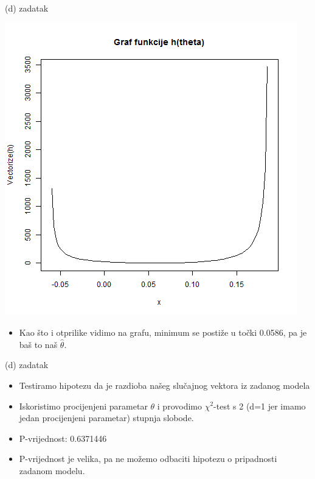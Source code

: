 \documentclass{beamer}
\begin{document}
\begin{frame}{(d) zadatak}
\begin{center}
\includegraphics[scale=0.28]{4.png}\\
\end{center}
\begin{itemize}
\item Kao što i otprilike vidimo na grafu, minimum se postiže u točki 0.0586, pa je baš to naš $\hat{\theta}$. \\
\end{itemize}
\end{frame}

\begin{frame}{(d) zadatak}
\begin{itemize}
\item Testiramo hipotezu da je razdioba našeg slučajnog vektora iz zadanog modela
\item Iskoristimo procijenjeni parametar $\theta$ i provodimo $\chi^2$-test s 2 (d=1 jer imamo jedan procijenjeni parametar) stupnja slobode. 
\item P-vrijednost: 0.6371446
\item P-vrijednost je velika, pa ne možemo odbaciti hipotezu o pripadnosti zadanom modelu.\\
\end{itemize}
\end{frame}
\end{document}
